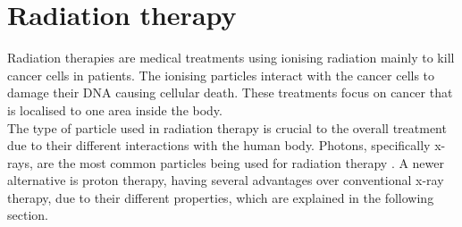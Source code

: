 %
%

\chapter{Radiation therapy}
Radiation therapies are medical treatments using ionising radiation mainly to kill cancer cells in patients. The ionising particles interact with the
cancer cells to damage their DNA causing cellular death. These treatments focus on cancer that is localised to one area inside the body. \\
The type of particle used in radiation therapy is crucial to the overall treatment due to their different interactions with the human body.
Photons, specifically x-rays, are the most common particles being used for radiation therapy \cite{pbt}.
A newer alternative is proton therapy, having several advantages over conventional x-ray therapy, due to their different properties, which are explained in the following section.


